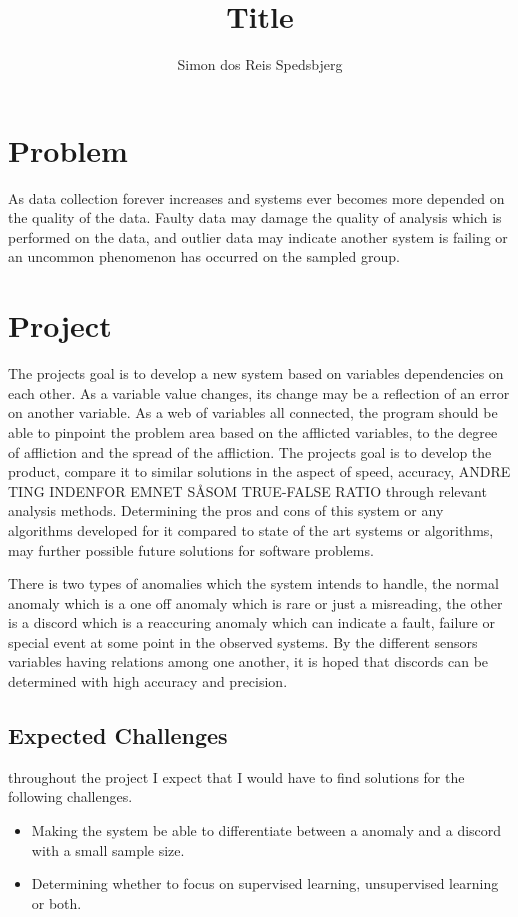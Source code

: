 \documentclass[a4paper,8pt]{article}
\title{Title}
\author{Simon dos Reis Spedsbjerg}
\begin{document}
	\maketitle
	
	\section{Problem}
	As data collection forever increases and systems ever becomes more depended on the quality of the data. Faulty data may damage the quality of analysis which is performed on the data, and outlier data may indicate another system is failing or an uncommon phenomenon has occurred on the sampled group.
	
	\section{Project}
	The projects goal is to develop a new system based on variables dependencies on each other. As a variable value changes, its change may be a reflection of an error on another variable. As a web of variables all connected, the program should be able to pinpoint the problem area based on the afflicted variables, to the degree of affliction and the spread of the affliction. The projects goal is to develop the product, compare it to similar solutions in the aspect of speed, accuracy, ANDRE TING INDENFOR EMNET SÅSOM TRUE-FALSE RATIO through relevant analysis methods. Determining the pros and cons of this system or any algorithms developed for it compared to state of the art systems or algorithms, may further possible future solutions for software problems.
	
	There is two types of anomalies which the system intends to handle, the normal anomaly which is a one off anomaly which is rare or just a misreading, the other is a discord which is a reaccuring anomaly which can indicate a fault, failure or special event at some point in the observed systems. By the different sensors variables having relations among one another, it is hoped that discords can be determined with high accuracy and precision.
	
	\subsection{Expected Challenges}
		throughout the project I expect that I would have to find solutions for the following challenges.
		\begin{itemize}
			\item Making the system be able to differentiate between a anomaly and a discord with a small sample size.
			\item Determining whether to focus on supervised learning, unsupervised learning or both.
		\end{itemize}
	
\end{document}
